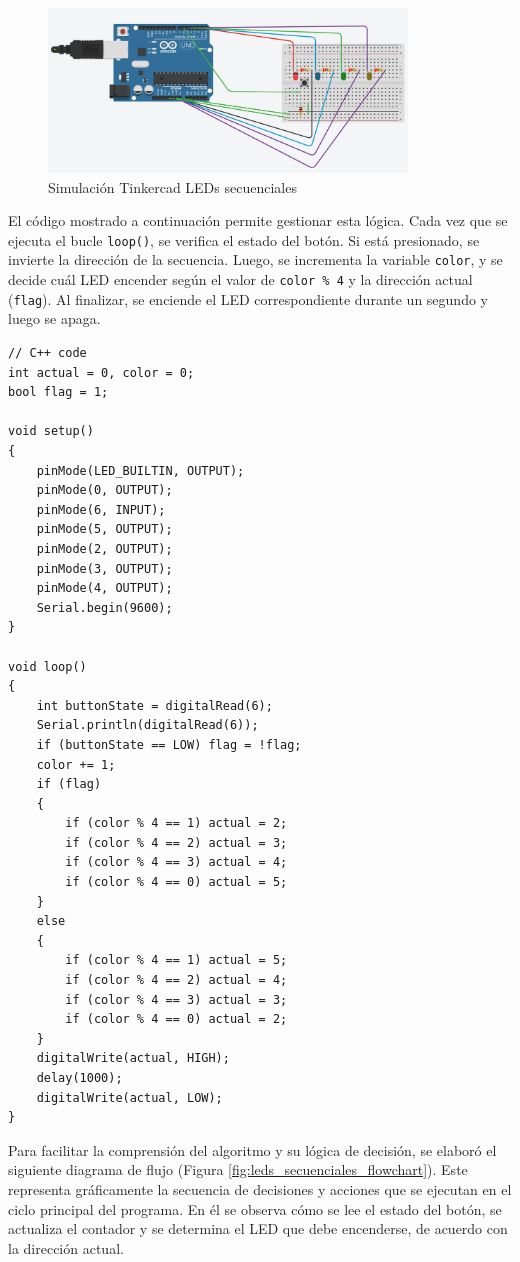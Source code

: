\documentclass{article}
\begin{document}
\begin{figure}[H]
    \centering
    \includegraphics[width=0.85\textwidth]{./img/ckpt_6_0.png}
    \caption{Simulación Tinkercad LEDs secuenciales}
    \label{fig:leds_secuenciales}
\end{figure}

El código mostrado a continuación permite gestionar esta lógica. Cada vez que se ejecuta el bucle \texttt{loop()}, se verifica el estado del botón. Si est\'a presionado, se invierte la dirección de la secuencia. Luego, se incrementa la variable \texttt{color}, y se decide cu\'al LED encender según el valor de \texttt{color \% 4} y la dirección actual (\texttt{flag}). Al finalizar, se enciende el LED correspondiente durante un segundo y luego se apaga.


\begin{lstlisting}[style=cppstyle, caption={Código en C++ para el control de LEDs secuenciales.}, label={code:leds_secuenciales}]
// C++ code
int actual = 0, color = 0;
bool flag = 1;

void setup()
{
    pinMode(LED_BUILTIN, OUTPUT);
    pinMode(0, OUTPUT);
    pinMode(6, INPUT);
    pinMode(5, OUTPUT);
    pinMode(2, OUTPUT);
    pinMode(3, OUTPUT);
    pinMode(4, OUTPUT);
    Serial.begin(9600);
}

void loop()
{ 
    int buttonState = digitalRead(6);
    Serial.println(digitalRead(6));
    if (buttonState == LOW) flag = !flag;
    color += 1;
    if (flag)
    {
        if (color % 4 == 1) actual = 2;
        if (color % 4 == 2) actual = 3;
        if (color % 4 == 3) actual = 4;
        if (color % 4 == 0) actual = 5;
    } 
    else 
    {
        if (color % 4 == 1) actual = 5;
        if (color % 4 == 2) actual = 4;
        if (color % 4 == 3) actual = 3;
        if (color % 4 == 0) actual = 2;
    }
    digitalWrite(actual, HIGH);
    delay(1000);
    digitalWrite(actual, LOW);
}
\end{lstlisting}

Para facilitar la comprensión del algoritmo y su lógica de decisión, se elaboró el siguiente diagrama de flujo (Figura \ref{fig:leds_secuenciales_flowchart}). Este representa gr\'aficamente la secuencia de decisiones y acciones que se ejecutan en el ciclo principal del programa. En él se observa cómo se lee el estado del botón, se actualiza el contador y se determina el LED que debe encenderse, de acuerdo con la dirección actual.
\end{document}
